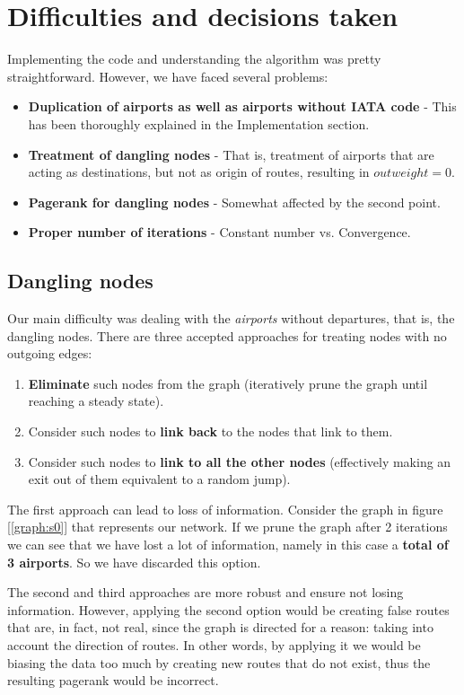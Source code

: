 \documentclass[10pt, a4paper]{article}
\begin{document}
\section{Difficulties and decisions taken}
Implementing the code and understanding the algorithm was pretty straightforward.
\noindent However, we have faced several problems:
\begin{itemize}
    \item \textbf{Duplication of airports as well as airports without IATA code} - This has been thoroughly explained in the Implementation section.
    \item \textbf{Treatment of dangling nodes} - That is, treatment of airports that are acting as destinations, but not as origin of routes, resulting in $outweight = 0$.
    \item \textbf{Pagerank for dangling nodes} - Somewhat affected by the second point.
    \item \textbf{Proper number of iterations} - Constant number vs. Convergence. 
\end{itemize}

\subsection{Dangling nodes}
Our main difficulty was dealing with the \textit{airports} without departures, that is, the dangling nodes.
There are three accepted approaches for treating nodes with no outgoing edges\cite{pageRank}:
\begin{enumerate}
    \item \textbf{Eliminate} such nodes from the graph (iteratively prune the graph until reaching a steady state). 
    \item Consider such nodes to\textbf{ link back} to the nodes that link to them.
    \item Consider such nodes to \textbf{link to all the other nodes} (effectively making an exit out of them equivalent to a random jump).
\end{enumerate}

The first approach can lead to loss of information. Consider the graph in figure [\ref{graph:s0}] that represents our network. If we prune the graph after 2 iterations we can see that we have lost a lot of information, namely in this case a \textbf{total of 3 airports}. So we have discarded this option.


\noindent The second and third approaches are more robust and ensure not losing information.
However, applying the second option would be creating false routes that are, in fact, not real, since the graph is directed for a reason: taking into account the direction of routes. In other words, by applying it  we would be biasing the data too much by creating new routes that do not exist, thus the resulting pagerank would be incorrect.
\end{document}
